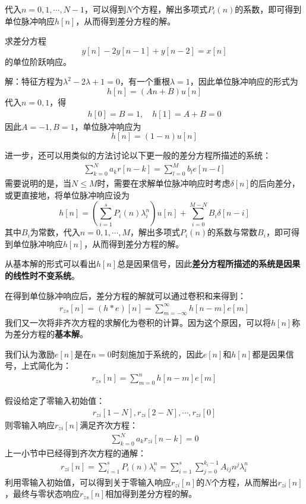 代入$n=0,1,\cdots,N-1$，可以得到$N$个方程，解出多项式$P_i(n)$的系数，即可得到单位脉冲响应$h[n]$，从而得到差分方程的解。

\begin{example}
    求差分方程
    $$y[n]-2y[n-1]+y[n-2]=x[n]$$
    的单位阶跃响应。

    解：特征方程为$\lambda^2-2\lambda+1=0$，有一个重根$\lambda=1$，因此单位脉冲响应的形式为
    $$h[n]=(A n+B)u[n]$$
    代入$n=0,1$，得\begin{align*}
    h[0]=B=1,\quad h[1]=A+B=0
    \end{align*}
    因此$A=-1,B=1$，单位脉冲响应为
    $$h[n]=(1-n)u[n]$$
\end{example}

进一步，还可以用类似的方法讨论以下更一般的差分方程所描述的系统：
\begin{align*}
    \sum_{k=0}^{N}a_k r[n-k] = \sum_{l=0}^{M}b_l e[n-l]
\end{align*}
需要说明的是，当$N\leq M$时，需要在求解单位脉冲响应时考虑$\delta[n]$的后向差分，或更直接地，将单位脉冲响应设为
$$h[n]=\left(\sum_{i=1}^s P_i(n) \lambda_i^n \right)u[n]+\sum_{i=0}^{M-N}B_i\delta[n-i]$$
其中$B_i$为常数，代入$n=0,1,\cdots,M$，解出多项式$P_i(n)$的系数与常数$B_i$，即可得到单位脉冲响应$h[n]$，从而得到差分方程的解。

从基本解的形式可以看出$h[n]$总是因果信号，因此\textbf{差分方程所描述的系统是因果的线性时不变系统}。

在得到单位脉冲响应后，差分方程的解就可以通过卷积和来得到：
\begin{align*}
    r_{zs}[n]=(h*e)[n]=\sum_{m=-\infty}^{\infty}h[n-m]e[m]
\end{align*}
我们又一次将非齐次方程的求解化为卷积的计算。因为这个原因，可以将$h[n]$称为差分方程的\textbf{基本解}。

我们认为激励$e[n]$是在$n=0$时刻施加于系统的，因此$e[n]$和$h[n]$都是因果信号，上式简化为：
\begin{align*}
    r_{zs}[n]=\sum_{m=0}^{n}h[n-m]e[m]
\end{align*}

假设给定了零输入初始值：
\begin{align*}
    r_{zi}[1-N],r_{zi}[2-N],\cdots,r_{zi}[0]
\end{align*}
则零输入响应$r_{zi}[n]$满足齐次方程：
\begin{align*}
    \sum_{k=0}^{N}a_k r_{zi}[n-k] = 0
\end{align*}
上一小节中已经得到齐次方程的通解：
\begin{align*}
    r_{zi}[n]=\sum_{i=1}^{s}P_i(n) \lambda_i^n=\sum_{i=1}^{s}\sum_{j=0}^{k_i-1}A_{ij} n^j \lambda_i^n
\end{align*}
利用零输入初始值，可以得到关于零输入响应$r_{zi}[n]$的$N$个方程，从而解出$r_{zi}[n]$，最终与零状态响应$r_{zs}[n]$相加得到差分方程的解。

